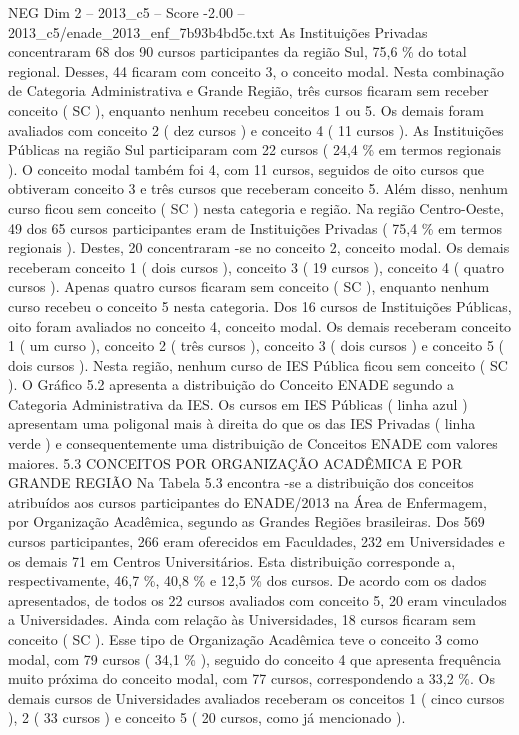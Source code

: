 \begin{textsample}{NEG Dim 2 – 2013\_c5 – Score -2.00 – 2013\_c5/enade\_2013\_enf\_7b93b4bd5c.txt}
As Instituições Privadas concentraram 68 dos 90 cursos participantes da região Sul, 75,6 \% do total regional.
Desses, 44 ficaram com conceito 3, o conceito modal.
Nesta combinação de Categoria Administrativa e Grande Região, três cursos ficaram sem receber conceito ( SC ), enquanto nenhum recebeu conceitos 1 ou 5.
Os demais foram avaliados com conceito 2 ( dez cursos ) e conceito 4 ( 11 cursos ).
As Instituições Públicas na região Sul participaram com 22 cursos ( 24,4 \% em termos regionais ).
O conceito modal também foi 4, com 11 cursos, seguidos de oito cursos que obtiveram conceito 3 e três cursos que receberam conceito 5.
Além disso, nenhum curso ficou sem conceito ( SC ) nesta categoria e região.
Na região Centro-Oeste, 49 dos 65 cursos participantes eram de Instituições Privadas ( 75,4 \% em termos regionais ).
Destes, 20 concentraram -se no conceito 2, conceito modal.
Os demais receberam conceito 1 ( dois cursos ), conceito 3 ( 19 cursos ), conceito 4 ( quatro cursos ).
Apenas quatro cursos ficaram sem conceito ( SC ), enquanto nenhum curso recebeu o conceito 5 nesta categoria.
Dos 16 cursos de Instituições Públicas, oito foram avaliados no conceito 4, conceito modal.
Os demais receberam conceito 1 ( um curso ), conceito 2 ( três cursos ), conceito 3 ( dois cursos ) e conceito 5 ( dois cursos ).
Nesta região, nenhum curso de IES Pública ficou sem conceito ( SC ).
O Gráfico 5.2 apresenta a distribuição do Conceito ENADE segundo a Categoria Administrativa da IES.
Os cursos em IES Públicas ( linha azul ) apresentam uma poligonal mais à direita do que os das IES Privadas ( linha verde ) e consequentemente uma distribuição de Conceitos ENADE com valores maiores. 5.3 CONCEITOS POR ORGANIZAÇÃO ACADÊMICA E POR GRANDE REGIÃO Na Tabela 5.3 encontra -se a distribuição dos conceitos atribuídos aos cursos participantes do ENADE/2013 na Área de Enfermagem, por Organização Acadêmica, segundo as Grandes Regiões brasileiras.
Dos 569 cursos participantes, 266 eram oferecidos em Faculdades, 232 em Universidades e os demais 71 em Centros Universitários.
Esta distribuição corresponde a, respectivamente, 46,7 \%, 40,8 \% e 12,5 \% dos cursos.
De acordo com os dados apresentados, de todos os 22 cursos avaliados com conceito 5, 20 eram vinculados a Universidades.
Ainda com relação às Universidades, 18 cursos ficaram sem conceito ( SC ).
Esse tipo de Organização Acadêmica teve o conceito 3 como modal, com 79 cursos ( 34,1 \% ), seguido do conceito 4 que apresenta frequência muito próxima do conceito modal, com 77 cursos, correspondendo a 33,2 \%.
Os demais cursos de Universidades avaliados receberam os conceitos 1 ( cinco cursos ), 2 ( 33 cursos ) e conceito 5 ( 20 cursos, como já mencionado ).

\end{textsample}
